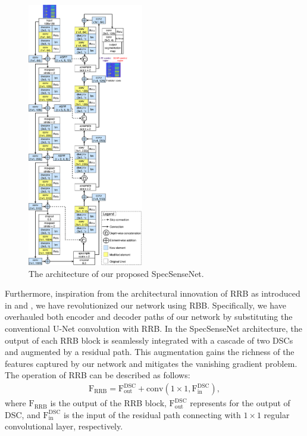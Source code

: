 \documentclass[journal]{IEEEtran} %
\begin{document}
\begin{figure}[!t]
    \centering
    \includegraphics[width=0.45\textwidth]{img/Design-SpecSenseNet.pdf}
    \caption{The architecture of our proposed SpecSenseNet.}
    \label{fig4}
\end{figure}

Furthermore, inspiration from the architectural innovation of RRB as introduced in \cite{aghalari2021brain} and \cite{he2016deep}, we have revolutionized our network using RBB. Specifically, we have overhauled both encoder and decoder paths of our network by substituting the conventional U-Net convolution with RRB. In the SpecSenseNet architecture, the output of each RRB block is seamlessly integrated with a cascade of two DSCs and augmented by a residual path. This augmentation gains the richness of the features captured by our network and mitigates the vanishing gradient problem.
The operation of RRB can be described as follows:
\begin{equation}
\begin{aligned}
    \mathrm{F_\text{RRB}} = \mathrm{F}_\text{out}^\text{DSC} + \mathrm{conv(1\times1,\mathrm{F}_\text{in}^\text{DSC})},
    \label{eq:RRB}
\end{aligned}
\end{equation}
where $\mathrm{F_\text{RRB}}$ is the output of the RRB block, $\mathrm{F}_\text{out}^\text{DSC}$ represents for the output of DSC, and $\mathrm{F}_\text{in}^\text{DSC}$ is the input of the residual path connecting with $1\times1$ regular convolutional layer, respectively.
\end{document}
